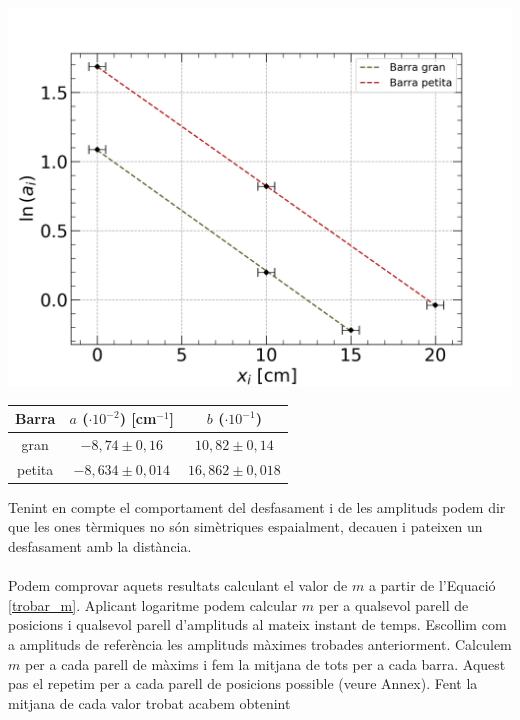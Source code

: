 \documentclass[12pt,twosides,onecolumn,openany]{article}
\newenvironment{Figura}
  {\par\medskip\noindent\minipage{\linewidth}}
  {\endminipage\par\medskip}
\begin{document}
\begin{multicols}{2}
\begin{Figura}
  \centering
  \includegraphics[width=1\linewidth]{../../graphs/practica_Ia/plots/reg_ampli.png}
  \label{fig:reg_lin_amplituds}
\end{Figura}
\begin{Figura}
  \centering
  \begin{tabular}{c|c|c}
    Barra & $a$ ($\cdot 10^{-2}$) [cm$^{-1}$] & $b$ ($\cdot10^{-1}$) \\ \hline\hline
    gran & $-8,74\pm0,16$ & $10,82\pm0,14$\\
    petita & $-8,634\pm0,014$ & $16,862\pm0,018$ 
  \end{tabular}
  \label{tau:pendent_amplituds}
\end{Figura} 
Tenint en compte el comportament del desfasament i de les amplituds podem dir que les ones tèrmiques no són simètriques espaialment, decauen i pateixen un desfasament amb la distància.\\\\
Podem comprovar aquets resultats calculant el valor de $m$ a partir de l'Equació \ref{trobar_m}. Aplicant logaritme podem calcular $m$ per a qualsevol parell de posicions i qualsevol parell d'amplituds al mateix instant de temps. Escollim com a amplituds de referència les amplituds màximes trobades anteriorment. Calculem $m$ per a cada parell de màxims i fem la mitjana de tots per a cada barra. Aquest pas el repetim per a cada parell de posicions possible (veure Annex). Fent la mitjana de cada valor trobat acabem obtenint

\end{multicols}
\end{document}
